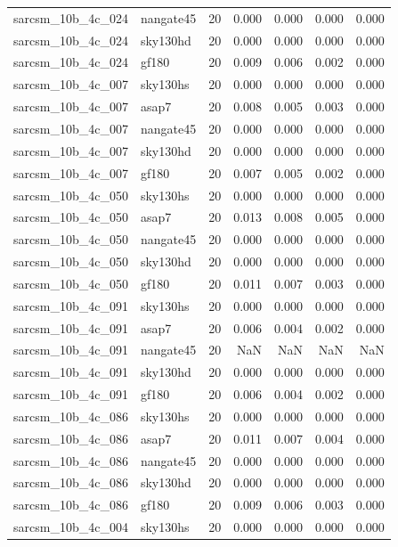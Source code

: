 \begin{tabular}{llrrrrr}
sarcsm\_10b\_4c\_024 & nangate45 & 20 & 0.000 & 0.000 & 0.000 & 0.000 \\
sarcsm\_10b\_4c\_024 & sky130hd & 20 & 0.000 & 0.000 & 0.000 & 0.000 \\
sarcsm\_10b\_4c\_024 & gf180 & 20 & 0.009 & 0.006 & 0.002 & 0.000 \\
sarcsm\_10b\_4c\_007 & sky130hs & 20 & 0.000 & 0.000 & 0.000 & 0.000 \\
sarcsm\_10b\_4c\_007 & asap7 & 20 & 0.008 & 0.005 & 0.003 & 0.000 \\
sarcsm\_10b\_4c\_007 & nangate45 & 20 & 0.000 & 0.000 & 0.000 & 0.000 \\
sarcsm\_10b\_4c\_007 & sky130hd & 20 & 0.000 & 0.000 & 0.000 & 0.000 \\
sarcsm\_10b\_4c\_007 & gf180 & 20 & 0.007 & 0.005 & 0.002 & 0.000 \\
sarcsm\_10b\_4c\_050 & sky130hs & 20 & 0.000 & 0.000 & 0.000 & 0.000 \\
sarcsm\_10b\_4c\_050 & asap7 & 20 & 0.013 & 0.008 & 0.005 & 0.000 \\
sarcsm\_10b\_4c\_050 & nangate45 & 20 & 0.000 & 0.000 & 0.000 & 0.000 \\
sarcsm\_10b\_4c\_050 & sky130hd & 20 & 0.000 & 0.000 & 0.000 & 0.000 \\
sarcsm\_10b\_4c\_050 & gf180 & 20 & 0.011 & 0.007 & 0.003 & 0.000 \\
sarcsm\_10b\_4c\_091 & sky130hs & 20 & 0.000 & 0.000 & 0.000 & 0.000 \\
sarcsm\_10b\_4c\_091 & asap7 & 20 & 0.006 & 0.004 & 0.002 & 0.000 \\
sarcsm\_10b\_4c\_091 & nangate45 & 20 & NaN & NaN & NaN & NaN \\
sarcsm\_10b\_4c\_091 & sky130hd & 20 & 0.000 & 0.000 & 0.000 & 0.000 \\
sarcsm\_10b\_4c\_091 & gf180 & 20 & 0.006 & 0.004 & 0.002 & 0.000 \\
sarcsm\_10b\_4c\_086 & sky130hs & 20 & 0.000 & 0.000 & 0.000 & 0.000 \\
sarcsm\_10b\_4c\_086 & asap7 & 20 & 0.011 & 0.007 & 0.004 & 0.000 \\
sarcsm\_10b\_4c\_086 & nangate45 & 20 & 0.000 & 0.000 & 0.000 & 0.000 \\
sarcsm\_10b\_4c\_086 & sky130hd & 20 & 0.000 & 0.000 & 0.000 & 0.000 \\
sarcsm\_10b\_4c\_086 & gf180 & 20 & 0.009 & 0.006 & 0.003 & 0.000 \\
sarcsm\_10b\_4c\_004 & sky130hs & 20 & 0.000 & 0.000 & 0.000 & 0.000 \\

\end{tabular}
